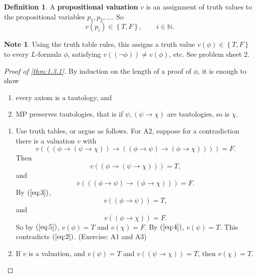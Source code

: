 \documentclass{article}
\newcommand{\N}{\mathbb{N}}
\newcommand{\rb}[1]{\left( #1 \right)}
\newcommand{\cb}[1]{\left\{ #1 \right\}}
\newcommand{\notb}[1]{\rb{\neg #1}}
\newcommand{\impb}[2]{\rb{#1 \rightarrow #2}}
\theoremstyle{definition}\newtheorem{definition}{Definition}[subsection]
\theoremstyle{definition}\newtheorem{remark1}[definition]{Remark}
\theoremstyle{definition}\newtheorem{example1}[definition]{Example}
\theoremstyle{definition}\newtheorem*{remark2}{Remark}
\theoremstyle{definition}\newtheorem*{example2}{Example}
\theoremstyle{definition}\newtheorem*{note}{Note}
\theoremstyle{definition}\newtheorem*{notation}{Notation}
\begin{document}
\begin{definition}
A \textbf{propositional valuation} $ v $ is an assignment of truth values to the propositional variables $ p_1, p_2, \dots $. So
$$ v\rb{p_i} \in \cb{T, F}, \qquad i \in \N. $$
\end{definition}

\begin{note}
Using the truth table rules, this assigns a truth value $ v\rb{\phi} \in \cb{T, F} $ to every $ L $-formula $ \phi $, satisfying $ v\rb{\notb{\phi}} \ne v\rb{\phi} $, etc. See problem sheet $ 2 $.
\end{note}

\begin{proof}[Proof of \ref{thm:1.3.1}]
By induction on the length of a proof of $ \phi $, it is enough to show
\begin{enumerate}
\item every axiom is a tautology, and
\item MP preserves tautologies, that is if $ \psi, \impb{\psi}{\chi} $ are tautologies, so is $ \chi $.
\end{enumerate}
\begin{enumerate}
\item Use truth tables, or argue as follows. For A2, suppose for a contradiction there is a valuation $ v $ with
$$ v\rb{\impb{\impb{\phi}{\impb{\psi}{\chi}}}{\impb{\impb{\phi}{\psi}}{\impb{\phi}{\chi}}}} = F. $$
Then
\begin{equation}
\label{eq:2}
v\rb{\impb{\phi}{\impb{\psi}{\chi}}} = T,
\end{equation}
and
\begin{equation}
\label{eq:3}
v\rb{\impb{\impb{\phi}{\psi}}{\impb{\phi}{\chi}}} = F.
\end{equation}
By $ \rb{\ref{eq:3}} $,
\begin{equation}
\label{eq:4}
v\rb{\impb{\phi}{\psi}} = T,
\end{equation}
and
\begin{equation}
\label{eq:5}
v\rb{\impb{\phi}{\chi}} = F.
\end{equation}
So by $ \rb{\ref{eq:5}} $, $ v\rb{\phi} = T $ and $ v\rb{\chi} = F $. By $ \rb{\ref{eq:4}} $, $ v\rb{\psi} = T $. This contradicts $ \rb{\ref{eq:2}} $. (Exercise: A1 and A3)
\item If $ v $ is a valuation, and $ v\rb{\psi} = T $ and $ v\rb{\impb{\psi}{\chi}} = T $, then $ v\rb{\chi} = T $.
\end{enumerate}
\end{proof}
\end{document}
